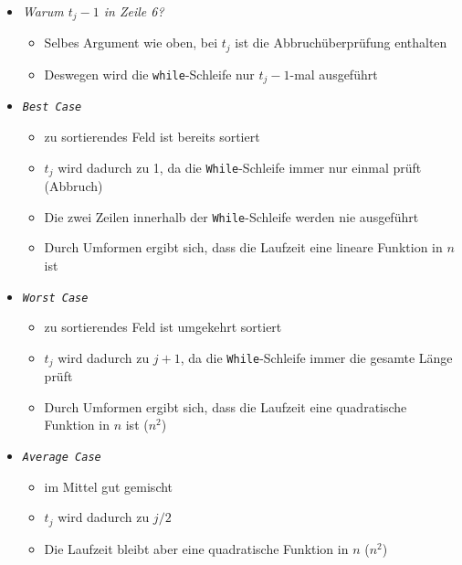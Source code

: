 \documentclass[
    ngerman,
    color=3b,
    load_common, %
    summary,
    boxarc,
]{tuda_summary}
\begin{document}
\begin{itemize}
\begin{itemize}
              \item \textit{Warum $t_j-1$ in Zeile 6?}
                    \begin{itemize}
                        \item Selbes Argument wie oben, bei $t_j$ ist die Abbruchüberprüfung enthalten
                        \item Deswegen wird die \texttt{while}-Schleife nur $t_j-1$-mal ausgeführt
                    \end{itemize}

              \item \textit{\texttt{Best Case}}
                    \begin{itemize}
                        \item zu sortierendes Feld ist bereits sortiert
                        \item $t_j$ wird dadurch zu 1, da die \texttt{While}-Schleife immer nur einmal prüft (Abbruch)
                        \item Die zwei Zeilen innerhalb der \texttt{While}-Schleife werden nie ausgeführt
                        \item Durch Umformen ergibt sich, dass die Laufzeit eine lineare Funktion in $n$ ist
                    \end{itemize}

              \item \textit{\texttt{Worst Case}}
                    \begin{itemize}
                        \item zu sortierendes Feld ist umgekehrt sortiert
                        \item $t_j$ wird dadurch zu $j+1$, da die \texttt{While}-Schleife immer die gesamte Länge prüft
                        \item Durch Umformen ergibt sich, dass die Laufzeit eine quadratische Funktion in $n$ ist ($n^2$)
                    \end{itemize}

              \item \textit{\texttt{Average Case} }
                    \begin{itemize}
                        \item im Mittel gut gemischt
                        \item $t_j$ wird dadurch zu $j/2$
                        \item Die Laufzeit bleibt aber eine quadratische Funktion in $n$ ($n^2$)
                    \end{itemize}
          \end{itemize}


\end{itemize}
\end{document}
